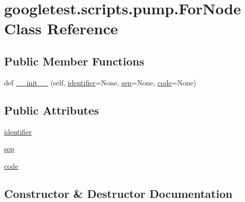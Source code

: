 \hypertarget{classgoogletest_1_1scripts_1_1pump_1_1_for_node}{}\section{googletest.\+scripts.\+pump.\+For\+Node Class Reference}
\label{classgoogletest_1_1scripts_1_1pump_1_1_for_node}
\subsection*{Public Member Functions}
\begin{DoxyCompactItemize}
\item 
def \mbox{\hyperlink{classgoogletest_1_1scripts_1_1pump_1_1_for_node_aaabd21bf961d822cf5b92e8a81427986}{\+\_\+\+\_\+init\+\_\+\+\_\+}} (self, \mbox{\hyperlink{classgoogletest_1_1scripts_1_1pump_1_1_for_node_a0b5798f7d22dcd1360aaa09a95e500a0}{identifier}}=None, \mbox{\hyperlink{classgoogletest_1_1scripts_1_1pump_1_1_for_node_a5f5432ec97a2bd799120891058353e8d}{sep}}=None, \mbox{\hyperlink{classgoogletest_1_1scripts_1_1pump_1_1_for_node_a6a6fe26dd0121a8e04c420da16b8b6c7}{code}}=None)
\end{DoxyCompactItemize}
\subsection*{Public Attributes}
\begin{DoxyCompactItemize}
\item 
\mbox{\hyperlink{classgoogletest_1_1scripts_1_1pump_1_1_for_node_a0b5798f7d22dcd1360aaa09a95e500a0}{identifier}}
\item 
\mbox{\hyperlink{classgoogletest_1_1scripts_1_1pump_1_1_for_node_a5f5432ec97a2bd799120891058353e8d}{sep}}
\item 
\mbox{\hyperlink{classgoogletest_1_1scripts_1_1pump_1_1_for_node_a6a6fe26dd0121a8e04c420da16b8b6c7}{code}}
\end{DoxyCompactItemize}


\subsection{Constructor \& Destructor Documentation}
\mbox{\label{classgoogletest_1_1scripts_1_1pump_1_1_for_node_aaabd21bf961d822cf5b92e8a81427986}} 
